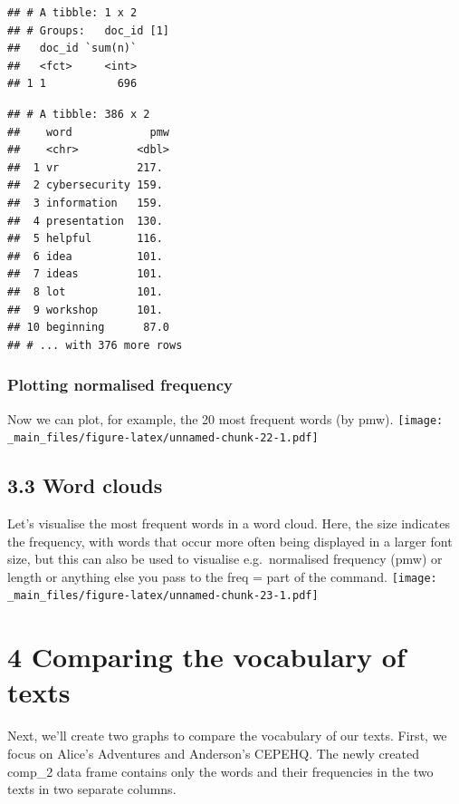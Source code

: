 \documentclass[a4paper, nobind]{templates/ociamthesis}
\begin{document}
\begin{verbatim}
## # A tibble: 1 x 2
## # Groups:   doc_id [1]
##   doc_id `sum(n)`
##   <fct>     <int>
## 1 1           696
\end{verbatim}

\begin{verbatim}
## # A tibble: 386 x 2
##    word            pmw
##    <chr>         <dbl>
##  1 vr            217. 
##  2 cybersecurity 159. 
##  3 information   159. 
##  4 presentation  130. 
##  5 helpful       116. 
##  6 idea          101. 
##  7 ideas         101. 
##  8 lot           101. 
##  9 workshop      101. 
## 10 beginning      87.0
## # ... with 376 more rows
\end{verbatim}

\hypertarget{plotting-normalised-frequency}{%
\subsubsection{Plotting normalised frequency}\label{plotting-normalised-frequency}}

Now we can plot, for example, the 20 most frequent words (by pmw).
\texttt{[image: \_main\_files/figure-latex/unnamed-chunk-22-1.pdf]}

\hypertarget{word-clouds}{%
\subsection{3.3 Word clouds}\label{word-clouds}}

Let's visualise the most frequent words in a word cloud. Here, the size indicates the frequency, with words that occur more often being displayed in a larger font size, but this can also be used to visualise e.g.~normalised frequency (pmw) or length or anything else you pass to the freq = part of the command.
\texttt{[image: \_main\_files/figure-latex/unnamed-chunk-23-1.pdf]}

\hypertarget{comparing-the-vocabulary-of-texts}{%
\section{4 Comparing the vocabulary of texts}\label{comparing-the-vocabulary-of-texts}}

Next, we'll create two graphs to compare the vocabulary of our texts. First, we focus on Alice's Adventures and Anderson's CEPEHQ. The newly created comp\_2 data frame contains only the words and their frequencies in the two texts in two separate columns.
\end{document}
